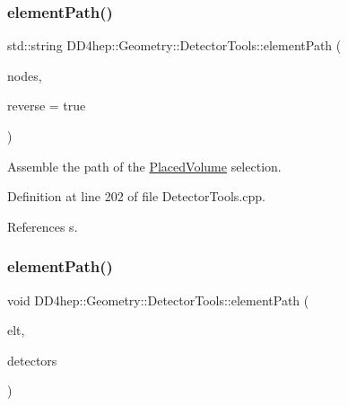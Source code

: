 \subsubsection{\texorpdfstring{element\+Path()}{elementPath()}\hspace{0.1cm}{\footnotesize\ttfamily [6/7]}}
{\footnotesize\ttfamily std\+::string D\+D4hep\+::\+Geometry\+::\+Detector\+Tools\+::element\+Path (\begin{DoxyParamCaption}\item[{const \hyperlink{namespace_d_d4hep_1_1_geometry_1_1_detector_tools_a57c8f37a975258fd84676a69e74c56ab}{Element\+Path} \&}]{nodes,  }\item[{bool}]{reverse = {\ttfamily true} }\end{DoxyParamCaption})}



Assemble the path of the \hyperlink{class_d_d4hep_1_1_geometry_1_1_placed_volume}{Placed\+Volume} selection. 



Definition at line 202 of file Detector\+Tools.\+cpp.



References s.

\hypertarget{namespace_d_d4hep_1_1_geometry_1_1_detector_tools_a10418f7d98665f48f0dcb14a02919fea}{}\label{namespace_d_d4hep_1_1_geometry_1_1_detector_tools_a10418f7d98665f48f0dcb14a02919fea} 
\subsubsection{\texorpdfstring{element\+Path()}{elementPath()}\hspace{0.1cm}{\footnotesize\ttfamily [7/7]}}
{\footnotesize\ttfamily void D\+D4hep\+::\+Geometry\+::\+Detector\+Tools\+::element\+Path (\begin{DoxyParamCaption}\item[{\hyperlink{class_d_d4hep_1_1_geometry_1_1_det_element}{Det\+Element}}]{elt,  }\item[{\hyperlink{namespace_d_d4hep_1_1_geometry_1_1_detector_tools_a57c8f37a975258fd84676a69e74c56ab}{Element\+Path} \&}]{detectors }\end{DoxyParamCaption})}



